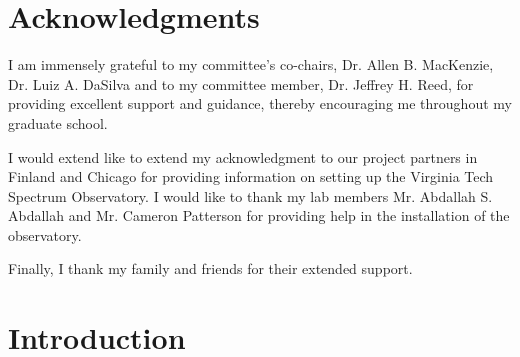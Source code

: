 \documentclass[12pt,sts]{report}
\begin{document}
\vfill

\pagebreak


\tableofcontents

\pagebreak

\listoffigures
\pagebreak

\listoftables
\pagebreak

\section*{Acknowledgments}

I am immensely grateful to my committee's co-chairs, Dr. Allen B. MacKenzie, Dr. Luiz A. DaSilva and to my committee member, Dr. Jeffrey H. Reed, for providing excellent support and guidance, thereby encouraging me throughout my graduate school.

I would extend like to extend my acknowledgment to our project partners in Finland and Chicago for providing information on setting up the Virginia Tech Spectrum Observatory. I would like to thank my lab members Mr. Abdallah S. Abdallah and Mr. Cameron Patterson for providing help in the installation of the observatory.

Finally, I thank my family and friends for their extended support.
\pagebreak

\pagestyle{myheadings}

\renewcommand\thesection{\arabic{section}}

\section{Introduction}
\end{document}
